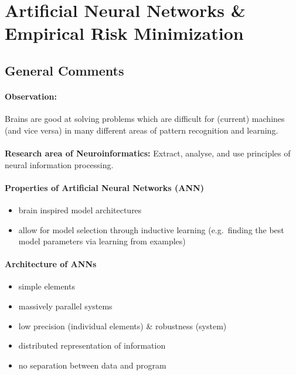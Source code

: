\section{Artificial Neural Networks \& Empirical Risk Minimization}


\subsection{General Comments}

\paragraph{Observation:}
\label{sec:observation} Brains are good at solving problems which are
difficult for (current) machines (and vice versa) in many different
areas of pattern recognition and learning.
\\\\
\textbf{Research area of Neuroinformatics:} Extract, analyse, and use
principles of neural information processing.

\paragraph{Properties of Artificial Neural Networks (ANN)}
\begin{itemize}
	\item brain inspired model architectures
	\item allow for model selection through inductive learning
          (e.g.\ finding the best model parameters via learning from examples)
\end{itemize} 

\paragraph{Architecture of ANNs} 
\begin{itemize}
	\item simple elements
	\item massively parallel systems
	\item low precision (individual elements) \& robustness (system)
	\item distributed representation of information
	\item no separation between data and program
\end{itemize} 

